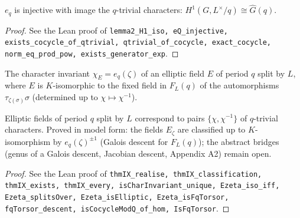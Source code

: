 \begin{lemma}[Lemma 2]
\label{lem:2}
\leanok
$e_q$ is injective with image the $q$-trivial characters: $H^1(G,L^\times/q)\cong\widehat G(q)$.
\end{lemma}
\begin{proof}
\leanok
See the Lean proof of \texttt{lemma2\_H1\_iso, eQ\_injective, exists\_cocycle\_of\_qtrivial, qtrivial\_of\_cocycle, exact\_cocycle, norm\_eq\_prod\_pow, exists\_generator\_exp}.
\end{proof}

\begin{definition}
\label{def:char-invariant}
\leanok
The character invariant $\chi_E=e_q(\zeta)$ of an elliptic field $E$ of period $q$ split by $L$, where $E$ is $K$-isomorphic to the fixed field in $F_L(q)$ of the automorphisms $\tau_{\zeta(\sigma)}\sigma$ (determined up to $\chi\mapsto\chi^{-1}$).
\end{definition}

\begin{theorem}[Theorem IX]
\label{thm:IX}
\leanok
Elliptic fields of period $q$ split by $L$ correspond to pairs $\{\chi,\chi^{-1}\}$ of $q$-trivial characters. Proved in model form: the fields $E_\zeta$ are classified up to $K$-isomorphism by $e_q(\zeta)^{\pm1}$ (Galois descent for $F_L(q)$); the abstract bridges (genus of a Galois descent, Jacobian descent, Appendix A2) remain open.
\end{theorem}
\begin{proof}
\leanok
See the Lean proof of \texttt{thmIX\_realise, thmIX\_classification, thmIX\_exists, thmIX\_every, isCharInvariant\_unique, Ezeta\_iso\_iff, Ezeta\_splitsOver, Ezeta\_isElliptic, Ezeta\_isFqTorsor, fqTorsor\_descent, isCocycleModQ\_of\_hom, IsFqTorsor}.
\end{proof}

